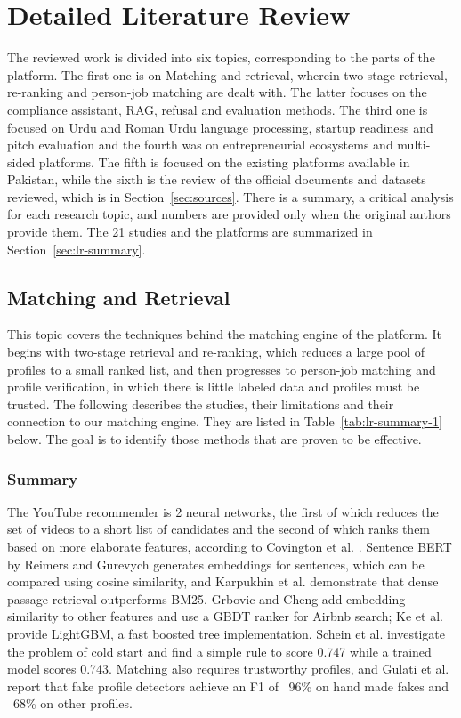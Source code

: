 \documentclass{FastFyp}
\begin{document}
\section{Detailed Literature Review}\label{sec:lr-detailed}
The reviewed work is divided into six topics, corresponding to the parts of the platform. The first one is on Matching and retrieval, wherein two stage retrieval, re-ranking and person-job matching are dealt with. The latter focuses on the compliance assistant, RAG, refusal and evaluation methods. The third one is focused on Urdu and Roman Urdu language processing, startup readiness and pitch evaluation and the fourth was on entrepreneurial ecosystems and multi-sided platforms. The fifth is focused on the existing platforms available in Pakistan, while the sixth is the review of the official documents and datasets reviewed, which is in Section~\ref{sec:sources}. There is a summary, a critical analysis for each research topic, and numbers are provided only when the original authors provide them. The 21 studies and the platforms are summarized in Section~\ref{sec:lr-summary}.

\subsection{Matching and Retrieval}\label{sec:lr-retrieval}
This topic covers the techniques behind the matching engine of the platform. It begins with two-stage retrieval and re-ranking, which reduces a large pool of profiles to a small ranked list, and then progresses to person-job matching and profile verification, in which there is little labeled data and profiles must be trusted. The following describes the studies, their limitations and their connection to our matching engine. They are listed in Table~\ref{tab:lr-summary-1} below. The goal is to identify those methods that are proven to be effective.

\subsubsection{Summary}
The YouTube recommender is 2 neural networks, the first of which reduces the set of videos to a short list of candidates and the second of which ranks them based on more elaborate features, according to Covington et al. \cite{ref:covington2016}. Sentence BERT by Reimers and Gurevych \cite{ref:reimers2019} generates embeddings for sentences, which can be compared using cosine similarity, and Karpukhin et al. \cite{ref:karpukhin2020} demonstrate that dense passage retrieval outperforms BM25. Grbovic and Cheng \cite{ref:grbovic2018} add embedding similarity to other features and use a GBDT ranker for Airbnb search; Ke et al. \cite{ref:ke2017} provide LightGBM, a fast boosted tree implementation. Schein et al. \cite{ref:schein2002} investigate the problem of cold start and find a simple rule to score 0.747 while a trained model scores 0.743. Matching also requires trustworthy profiles, and Gulati et al. \cite{ref:gulati2025} report that fake profile detectors achieve an F1 of ~96\% on hand made fakes and ~68\% on other profiles.
\end{document}
